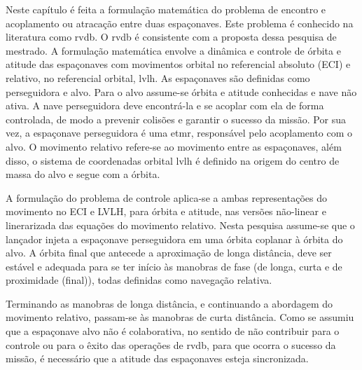 \label{sec_introducao_formulacao_problema}

Neste capítulo é feita a formulação matemática do problema de encontro e acoplamento ou atracação entre duas espaçonaves.
Este problema é conhecido na literatura como \gls{rvdb}.
O \gls{rvdb} é consistente com a proposta dessa pesquisa de mestrado.
A formulação matemática envolve a dinâmica e controle de órbita e atitude das espaçonaves com movimentos orbital no referencial absoluto (ECI) e relativo, no referencial orbital, \gls{lvlh}.
As espaçonaves são definidas como perseguidora e alvo.
Para o alvo assume-se órbita e atitude conhecidas e nave não ativa.
A nave perseguidora deve encontrá-la e se acoplar com ela de forma controlada, de modo a prevenir colisões e garantir o sucesso da missão.
Por sua vez, a espaçonave perseguidora é uma \gls{etmr}, responsável pelo acoplamento com o alvo.
O movimento relativo refere-se ao movimento entre as espaçonaves, além disso, o sistema de coordenadas orbital \gls{lvlh} é definido na origem do centro de massa do alvo e segue com a órbita.

A formulação do problema de controle aplica-se a ambas representações do movimento no ECI e LVLH, para órbita e atitude, nas versões não-linear e linerarizada das equações do movimento relativo.
Nesta pesquisa assume-se que o lançador injeta a espaçonave perseguidora em uma órbita coplanar à órbita do alvo.
A órbita final que antecede a aproximação de longa distância, deve ser estável e adequada para se ter início às manobras de fase (de longa, curta e de proximidade (final)), todas definidas como navegação relativa.

Terminando as manobras de longa distância, e continuando a abordagem do movimento relativo, passam-se às manobras de curta distância.
Como se assumiu que a espaçonave alvo não é colaborativa, no sentido de não contribuir para o controle ou para o êxito das operações de \gls{rvdb}, para que ocorra o sucesso da missão, é necessário que a atitude das espaçonaves esteja sincronizada.
